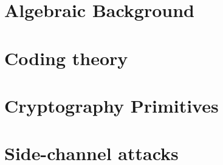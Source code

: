 \section{Algebraic Background}
\section{Coding theory}
\section{Cryptography Primitives}
\section{Side-channel attacks}
